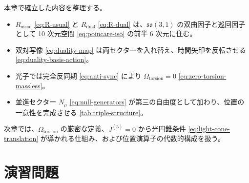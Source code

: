 \documentclass[dvipdfmx,a4paper,oneside]{jsbook}
\numberwithin{equation}{chapter}
\begin{document}
本章で確立した内容を整理する。

\begin{itemize}[leftmargin=2em]
  \item \(R_{\mathrm{usual}}\) \eqref{eq:R-usual} と \(R_{\mathrm{dual}}\) \eqref{eq:R-dual} は、\(\mathfrak{so}(3,1)\) の双曲因子と巡回因子として 10 次元空間 \eqref{eq:poincare-iso} の前半 6 次元に住む。
  \item 双対写像 \eqref{eq:duality-map} は両セクターを入れ替え、時間矢印を反転させる \eqref{eq:duality-basis-action}。
  \item 光子では完全反同期 \eqref{eq:anti-sync} により \(\Omega_{\mathrm{torsion}} = 0\) \eqref{eq:zero-torsion-massless}。
  \item 並進セクター \(N_\mu\) \eqref{eq:null-generators} が第三の自由度として加わり、位置の一意性を完成させる \eqref{tab:triple-structure}。
\end{itemize}

次章では、\(\Omega_{\mathrm{torsion}}\) の厳密な定義、\(J^{(5)} = 0\) から光円錐条件 \eqref{eq:light-cone-translation} が導かれる仕組み、および位置演算子の代数的構成を扱う。

\section*{演習問題}
\end{document}
